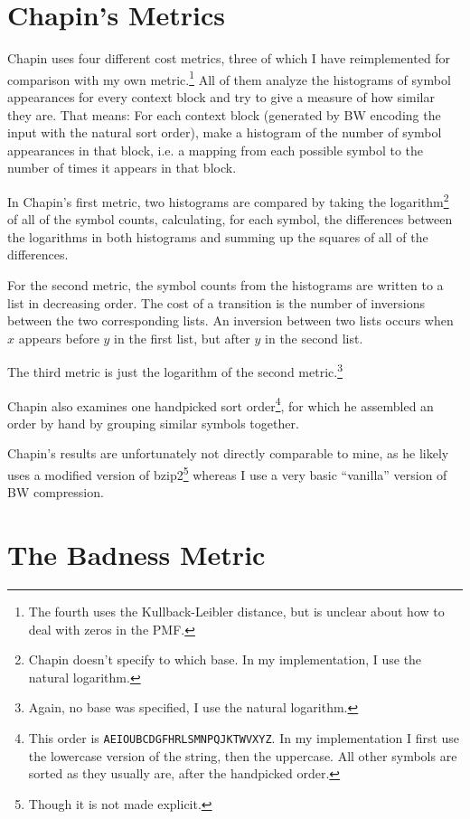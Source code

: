 \documentclass[a4paper]{scrreprt}
\begin{document}
\section{Chapin's Metrics}

Chapin uses four different cost metrics, three of which I have reimplemented for
comparison with my own metric.\footnote{The fourth uses the Kullback-Leibler
distance, but is unclear about how to deal with zeros in the PMF.} All of them
analyze the histograms of symbol appearances for every context block and try to
give a measure of how similar they are. That means: For each context block
(generated by BW encoding the input with the natural sort order), make a
histogram of the number of symbol appearances in that block, i.e. a mapping from
each possible symbol to the number of times it appears in that block.

In Chapin's first metric, two histograms are compared by taking the
logarithm\footnote{Chapin doesn't specify to which base. In my implementation,
I use the natural logarithm.} of all of the symbol counts, calculating, for each
symbol, the differences between the logarithms in both histograms and summing up
the squares of all of the differences.

For the second metric, the symbol counts from the histograms are written to a
list in decreasing order. The cost of a transition is the number of inversions
between the two corresponding lists. An inversion between two lists occurs when
\(x\) appears before \(y\) in the first list, but after \(y\) in the second
list.

The third metric is just the logarithm of the second metric.\footnote{Again, no
base was specified, I use the natural logarithm.}

Chapin also examines one handpicked sort order\footnote{This order is
\texttt{AEIOUBCDGFHRLSMNPQJKTWVXYZ}. In my implementation I first use the
lowercase version of the string, then the uppercase. All other symbols are
sorted as they usually are, after the handpicked order.}, for which he assembled
an order by hand by grouping similar symbols together.

Chapin's results are unfortunately not directly comparable to mine, as he likely
uses a modified version of bzip2\footnote{Though it is not made explicit.}
whereas I use a very basic ``vanilla'' version of BW compression.

\section{The Badness Metric}
\end{document}
